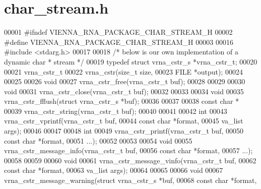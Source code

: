 \hypertarget{datastructures_2char__stream_8h_source}{}\section{char\+\_\+stream.\+h}
\label{datastructures_2char__stream_8h_source}

\begin{DoxyCode}
00001 \textcolor{preprocessor}{#ifndef VIENNA\_RNA\_PACKAGE\_CHAR\_STREAM\_H}
00002 \textcolor{preprocessor}{#define VIENNA\_RNA\_PACKAGE\_CHAR\_STREAM\_H}
00003 
00016 \textcolor{preprocessor}{#include <stdarg.h>}
00017 
00018 \textcolor{comment}{/* below is our own implementation of a dynamic char * stream */}
00019 \textcolor{keyword}{typedef} \textcolor{keyword}{struct }vrna\_cstr\_s *vrna\_cstr\_t;
00020 
00021 vrna\_cstr\_t
00022 vrna\_cstr(\textcolor{keywordtype}{size\_t}  size,
00023           FILE    *output);
00024 
00025 
00026 \textcolor{keywordtype}{void}
00027 vrna\_cstr\_free(vrna\_cstr\_t buf);
00028 
00029 
00030 \textcolor{keywordtype}{void}
00031 vrna\_cstr\_close(vrna\_cstr\_t buf);
00032 
00033 
00034 \textcolor{keywordtype}{void}
00035 vrna\_cstr\_fflush(\textcolor{keyword}{struct} vrna\_cstr\_s *buf);
00036 
00037 
00038 \textcolor{keyword}{const} \textcolor{keywordtype}{char} *
00039 vrna\_cstr\_string(vrna\_cstr\_t buf);
00040 
00041 
00042 \textcolor{keywordtype}{int}
00043 vrna\_cstr\_vprintf(vrna\_cstr\_t buf,
00044                   \textcolor{keyword}{const} \textcolor{keywordtype}{char}  *format,
00045                   va\_list     args);
00046 
00047 
00048 \textcolor{keywordtype}{int}
00049 vrna\_cstr\_printf(vrna\_cstr\_t  buf,
00050                  \textcolor{keyword}{const} \textcolor{keywordtype}{char}   *format,
00051                  ...);
00052 
00053 
00054 \textcolor{keywordtype}{void}
00055 vrna\_cstr\_message\_info(vrna\_cstr\_t  buf,
00056                        \textcolor{keyword}{const} \textcolor{keywordtype}{char}   *format,
00057                        ...);
00058 
00059 
00060 \textcolor{keywordtype}{void}
00061 vrna\_cstr\_message\_vinfo(vrna\_cstr\_t buf,
00062                         \textcolor{keyword}{const} \textcolor{keywordtype}{char}  *format,
00063                         va\_list     args);
00064 
00065 
00066 \textcolor{keywordtype}{void}
00067 vrna\_cstr\_message\_warning(\textcolor{keyword}{struct} vrna\_cstr\_s  *buf,
00068                           \textcolor{keyword}{const} \textcolor{keywordtype}{char}          *format,

\end{DoxyCode}
